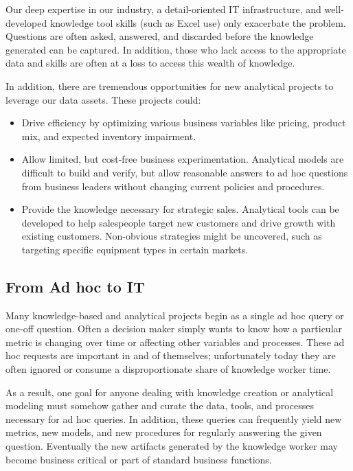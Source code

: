 \documentclass[letterpaper]{article}
\begin{document}
    Our deep expertise in our industry, a detail-oriented IT infrastructure,
    and well-developed knowledge tool skills (such as Excel use) only
    exacerbate the problem.  Questions are often asked, answered, and
    discarded  before the knowledge generated can be captured.  In addition,
    those who lack access to the appropriate data and skills are often at a
    loss to access this wealth of knowledge.

    In addition, there are tremendous opportunities for new analytical
    projects to leverage our data assets.  These projects could:
    
    \begin{itemize}
        \item Drive efficiency by optimizing various business variables like
        pricing, product mix, and expected inventory impairment.

        \item Allow limited, but cost-free business experimentation.  Analytical
        models are difficult to build and verify, but allow reasonable answers
        to ad hoc questions from business leaders without changing current
        policies and procedures.

        \item Provide the knowledge necessary for strategic sales.  Analytical
        tools can be developed to help salespeople target new customers and drive
        growth with existing customers.  Non-obvious strategies might be uncovered,
        such as targeting specific equipment types in certain markets.
    \end{itemize}
    
    \subsection{From Ad hoc to IT}

    Many knowledge-based and analytical projects begin as a single ad hoc
    query or one-off question.  Often a decision maker simply wants to know
    how a particular metric is changing over time or affecting other variables
    and processes.  These ad hoc requests are important in and of themselves;
    unfortunately today they are often ignored or consume a disproportionate
    share of knowledge worker time.

    As a result, one goal for anyone dealing with knowledge creation or analytical
    modeling must somehow gather and curate the data, tools, and processes necessary
    for ad hoc queries.  In addition, these queries can frequently yield new
    metrics, new models, and new procedures for regularly answering the given
    question.  Eventually the new artifacts generated by the knowledge
    worker may become business critical or part of standard business functions.
\end{document}
